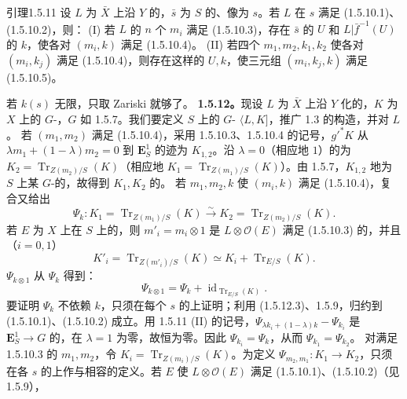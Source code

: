 \begin{SGAresult}{引理}{1.5.11}
设 $L$ 为 $\bar X$ 上沿 $Y$ 的，$\bar s$ 为 $S$ 的、像为 $s$。若 $L$ 在 $s$ 满足 (1.5.10.1)、(1.5.10.2)，则：
(I) 若 $L$ 的 $n$ 个 $m_i$ 满足 (1.5.10.3)，存在 $\bar s$ 的 $U$ 和 $L|\bar f^{-1}(U)$ 的 $k$，使各对 $(m_i,k)$ 满足 (1.5.10.4)。
(II) 若四个 $m_1,m_2,k_1,k_2$ 使各对 $(m_i,k_j)$ 满足 (1.5.10.4)，则存在这样的 $U,k$，使三元组 $(m_i,k_j,k)$ 满足 (1.5.10.5)。
\end{SGAresult}
若 $k(s)$ 无限，只取 Zariski 就够了。
\textbf{1.5.12。}现设 $L$ 为 $\bar X$ 上沿 $Y$ 化的，$K$ 为 $X$ 上的 $G$-，$G$ 如 1.5.7。我们要定义 $S$ 上的 $G$- $\langle L,K]$，推广 1.3 的构造，并对 $L$ 。
若 $(m_1,m_2)$ 满足 (1.5.10.4)，采用 1.5.10.3、1.5.10.4 的记号，$g'^*K$ 从 $\lambda m_1+(1-\lambda)m_2=0$ 到 $\mathbf E^1_S$ 的迹为 $K_{1,2}$。沿 $\lambda=0$（相应地 $1$）的为 $K_2=\operatorname{Tr}_{Z(m_2)/S}(K)$（相应地 $K_1=\operatorname{Tr}_{Z(m_1)/S}(K)$）。由 1.5.7，$K_{1,2}$ 地为 $S$ 上某 $G$-的，故得到 $K_1,K_2$ 的。
若 $m_1,m_2,k$ 使 $(m_i,k)$ 满足 (1.5.10.4)，复合又给出
\[\Psi_k:K_1=\operatorname{Tr}_{Z(m_1)/S}(K)\xrightarrow\sim K_2=\operatorname{Tr}_{Z(m_2)/S}(K).\tag{1.5.12.1}\]
若 $E$ 为 $X$ 上在 $S$ 上的，则 $m'_i=m_i\otimes1$ 是 $L\otimes\mathcal O(E)$ 满足 (1.5.10.3) 的，并且（$i=0,1$）
\[K'_i=\operatorname{Tr}_{Z(m'_i)/S}(K)\simeq K_i+\operatorname{Tr}_{E/S}(K).\tag{1.5.12.2}\]
 $\Psi_{k\otimes1}$ 从 $\Psi_k$ 得到：
\[\Psi_{k\otimes1}=\Psi_k+\operatorname{id}_{\operatorname{Tr}_{E/S}(K)}.\tag{1.5.12.3}\]
要证明 $\Psi_k$ 不依赖 $k$，只须在每个 $s$ 的上证明；利用 (1.5.12.3)、1.5.9，归约到 (1.5.10.1)、(1.5.10.2) 成立。用 1.5.11 (II) 的记号，$\Psi_{\lambda k_i+(1-\lambda)k}-\Psi_{k_i}$ 是 $\mathbf E^1_S\to G$ 的，在 $\lambda=1$ 为零，故恒为零。因此 $\Psi_{k_i}=\Psi_k$，从而 $\Psi_{k_1}=\Psi_{k_2}$。
对满足 1.5.10.3 的 $m_1,m_2$，令 $K_i=\operatorname{Tr}_{Z(m_i)/S}(K)$。为定义 $\Psi_{m_2,m_1}:K_1\to K_2$，只须在各 $s$ 的上作与相容的定义。若 $E$ 使 $L\otimes\mathcal O(E)$ 满足 (1.5.10.1)、(1.5.10.2)（见 1.5.9），
